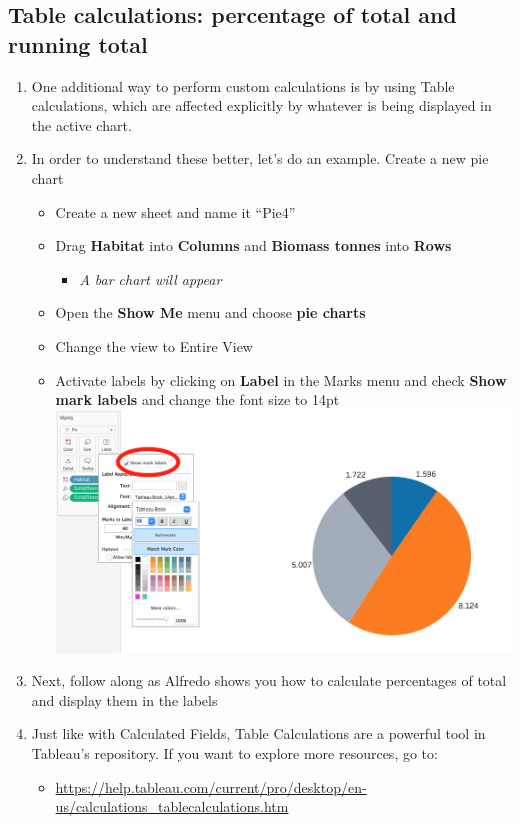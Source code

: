 \documentclass[
]{book}
\providecommand{\tightlist}{%
  \setlength{\itemsep}{0pt}\setlength{\parskip}{0pt}}
\begin{document}
\hypertarget{table-calculations-percentage-of-total-and-running-total}{%
\subsection{Table calculations: percentage of total and running total}\label{table-calculations-percentage-of-total-and-running-total}}

\begin{enumerate}
\def\labelenumi{\arabic{enumi}.}
\item
  One additional way to perform custom calculations is by using Table calculations, which are affected explicitly by whatever is being displayed in the active chart.
\item
  In order to understand these better, let's do an example. Create a new pie chart

  \begin{itemize}
  \tightlist
  \item
    Create a new sheet and name it ``Pie4''
  \item
    Drag \textbf{Habitat} into \textbf{Columns} and \textbf{Biomass tonnes} into \textbf{Rows}

    \begin{itemize}
    \tightlist
    \item
      \emph{A bar chart will appear }
    \end{itemize}
  \item
    Open the \textbf{Show Me} menu and choose \textbf{pie charts}
  \item
    Change the view to Entire View
  \item
    Activate labels by clicking on \textbf{Label} in the Marks menu and check \textbf{Show mark labels} and change the font size to 14pt
    \includegraphics{images/m3s4_pie-show-labels.png}
  \end{itemize}
\item
  Next, follow along as Alfredo shows you how to calculate percentages of total and display them in the labels
\item
  Just like with Calculated Fields, Table Calculations are a powerful tool in Tableau's repository. If you want to explore more resources, go to:

  \begin{itemize}
  \tightlist
  \item
    \url{https://help.tableau.com/current/pro/desktop/en-us/calculations_tablecalculations.htm}
  \end{itemize}
\end{enumerate}
\end{document}
